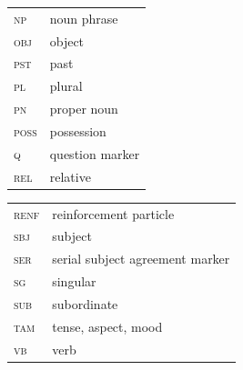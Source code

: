 \documentclass[output=paper,colorlinks,citecolor=brown]{langscibook}
\begin{document}
\begin{tabularx}{.45\textwidth}{lQ}
\scshape np &noun phrase \\ 
\scshape obj &object \\ 
\scshape pst &past \\ 
\scshape pl &plural \\ 
\scshape pn &proper noun \\ 
\scshape poss &possession \\ 
\scshape q &question marker \\ 
\scshape rel &relative \\ 
\end{tabularx}
\begin{tabularx}{.45\textwidth}{lQ}
\scshape renf &reinforcement particle \\ 
\scshape sbj & subject \\
\scshape ser &serial subject agreement marker \\ 
\scshape sg &singular \\ 
\scshape sub &subordinate \\ 
\scshape tam & tense, aspect, mood \\
\scshape vb & verb \\
\end{tabularx}

\sloppy\printbibliography[heading=subbibliography,notkeyword=this]
\end{document}
